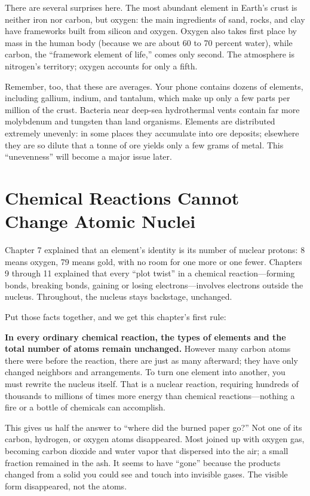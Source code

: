 There are several surprises here. The most abundant element in Earth's crust is neither iron nor carbon, but oxygen: the main ingredients of sand, rocks, and clay have frameworks built from silicon and oxygen. Oxygen also takes first place by mass in the human body (because we are about 60 to 70 percent water), while carbon, the ``framework element of life,'' comes only second. The atmosphere is nitrogen's territory; oxygen accounts for only a fifth.

Remember, too, that these are averages. Your phone contains dozens of elements, including gallium, indium, and tantalum, which make up only a few parts per million of the crust. Bacteria near deep-sea hydrothermal vents contain far more molybdenum and tungsten than land organisms. Elements are distributed extremely unevenly: in some places they accumulate into ore deposits; elsewhere they are so dilute that a tonne of ore yields only a few grams of metal. This ``unevenness'' will become a major issue later.

\section{Chemical Reactions Cannot Change Atomic Nuclei}

Chapter 7 explained that an element's identity is its number of nuclear protons: 8 means oxygen, 79 means gold, with no room for one more or one fewer. Chapters 9 through 11 explained that every ``plot twist'' in a chemical reaction---forming bonds, breaking bonds, gaining or losing electrons---involves electrons outside the nucleus. Throughout, the nucleus stays backstage, unchanged.

Put those facts together, and we get this chapter's first rule:

\begin{qiaoliang}
\textbf{In every ordinary chemical reaction, the types of elements and the total number of atoms remain unchanged.} However many carbon atoms there were before the reaction, there are just as many afterward; they have only changed neighbors and arrangements. To turn one element into another, you must rewrite the nucleus itself. That is a nuclear reaction, requiring hundreds of thousands to millions of times more energy than chemical reactions---nothing a fire or a bottle of chemicals can accomplish.
\end{qiaoliang}

This gives us half the answer to ``where did the burned paper go?'' Not one of its carbon, hydrogen, or oxygen atoms disappeared. Most joined up with oxygen gas, becoming carbon dioxide and water vapor that dispersed into the air; a small fraction remained in the ash. It seems to have ``gone'' because the products changed from a solid you could see and touch into invisible gases. The visible form disappeared, not the atoms.

